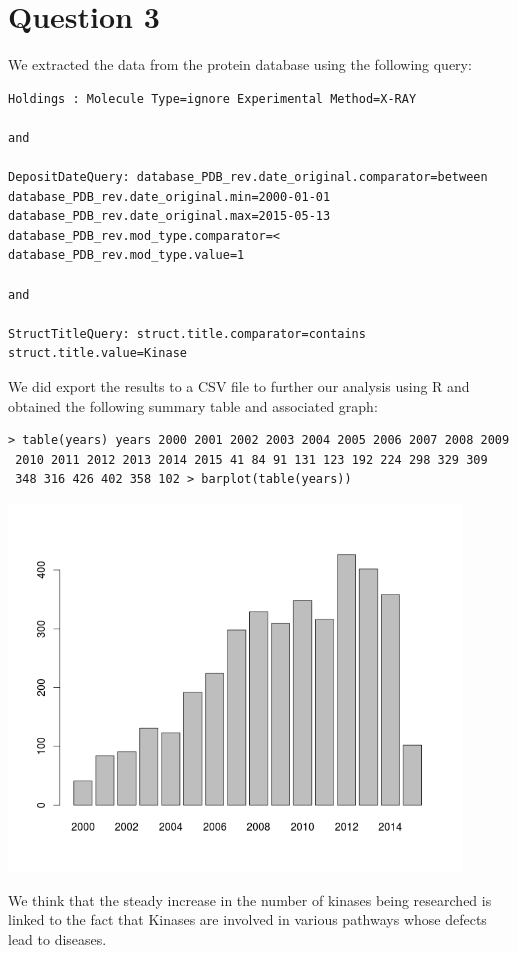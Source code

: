 \documentclass[11pt, a4paper,titlepage]{article}
\begin{document}
\section*{Question 3}
We extracted the data from the protein database using the following query:

\begin{verbatim}
Holdings : Molecule Type=ignore Experimental Method=X-RAY 

and 

DepositDateQuery: database_PDB_rev.date_original.comparator=between 
database_PDB_rev.date_original.min=2000-01-01 database_PDB_rev.date_original.max=2015-05-13 
database_PDB_rev.mod_type.comparator=< database_PDB_rev.mod_type.value=1 

and 

StructTitleQuery: struct.title.comparator=contains struct.title.value=Kinase
\end{verbatim}

We did export the results to a CSV file to further our analysis using
R and obtained the following summary table and associated graph:

\begin{verbatim}
> table(years) years 2000 2001 2002 2003 2004 2005 2006 2007 2008 2009
 2010 2011 2012 2013 2014 2015 41 84 91 131 123 192 224 298 329 309
 348 316 426 402 358 102 > barplot(table(years))
\end{verbatim}

\includegraphics[width=12cm]{./Figures/pdb_kinases_growth.png}

We think that the steady increase in the number of kinases being
researched is linked to the fact that Kinases are involved in various
pathways whose defects lead to diseases. 
\end{document}
